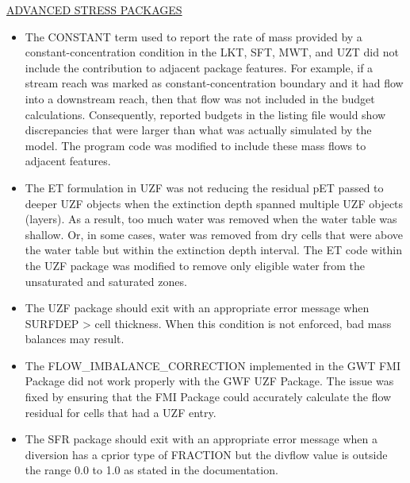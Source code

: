 \documentclass[11pt,twoside,twocolumn]{usgsreport}
\begin{document}
\begin{itemize}
	\underline{ADVANCED STRESS PACKAGES}
	\begin{itemize}
	        \item The CONSTANT term used to report the rate of mass provided by a constant-concentration condition in the LKT, SFT, MWT, and UZT did not include the contribution to adjacent package features.  For example, if a stream reach was marked as constant-concentration boundary and it had flow into a downstream reach, then that flow was not included in the budget calculations.  Consequently, reported budgets in the listing file would show discrepancies that were larger than what was actually simulated by the model.  The program code was modified to include these mass flows to adjacent features.
	        \item The ET formulation in UZF was not reducing the residual pET passed to deeper UZF objects when the extinction depth spanned multiple UZF objects (layers).  As a result, too much water was removed when the water table was shallow.  Or, in some cases, water was removed from dry cells that were above the water table but within the extinction depth interval. The ET code within the UZF package was modified to remove only eligible water from the unsaturated and saturated zones.
            \item The UZF package should exit with an appropriate error message when SURFDEP > cell thickness.  When this condition is not enforced, bad mass balances may result.  
            \item The FLOW\_IMBALANCE\_CORRECTION implemented in the GWT FMI Package did not work properly with the GWF UZF Package.  The issue was fixed by ensuring that the FMI Package could accurately calculate the flow residual for cells that had a UZF entry.
            \item The SFR package should exit with an appropriate error message when a diversion has a cprior type of FRACTION but the divflow value is outside the range 0.0 to 1.0 as stated in the documentation.
	\end{itemize}


\end{itemize}
\end{document}
